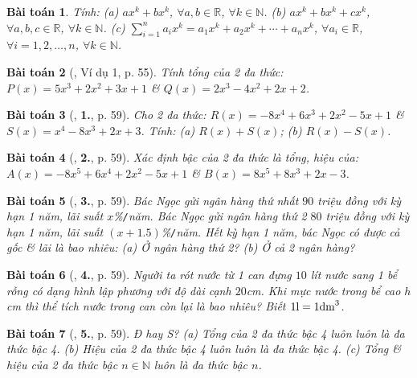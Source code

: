 \documentclass{article}
\numberwithin{equation}{section}
\newtheorem{baitoan}{Bài toán}
\begin{document}
\begin{baitoan}
	Tính: (a) $ax^k + bx^k$, $\forall a,b\in\mathbb{R}$, $\forall k\in\mathbb{N}$. (b) $ax^k + bx^k + cx^k$, $\forall a,b,c\in\mathbb{R}$, $\forall k\in\mathbb{N}$. (c) $\sum_{i=1}^n a_ix^k = a_1x^k + a_2x^k + \cdots + a_nx^k$, $\forall a_i\in\mathbb{R}$, $\forall i = 1,2,\ldots,n$, $\forall k\in\mathbb{N}$.
\end{baitoan}

\begin{baitoan}[\cite{SGK_Toan_7_Canh_Dieu_tap_2}, Ví dụ 1, p. 55]
	Tính tổng của 2 đa thức: $P(x) = 5x^3 + 2x^2 + 3x + 1$ \& $Q(x) = 2x^3 - 4x^2 + 2x + 2$.
\end{baitoan}

\begin{baitoan}[\cite{SGK_Toan_7_Canh_Dieu_tap_2}, \textbf{1.}, p. 59]
	Cho 2 đa thức: $R(x) = -8x^4 + 6x^3 + 2x^2 - 5x + 1$ \& $S(x) = x^4 - 8x^3 + 2x + 3$. Tính: (a) $R(x) + S(x)$; (b) $R(x) - S(x)$.
\end{baitoan}

\begin{baitoan}[\cite{SGK_Toan_7_Canh_Dieu_tap_2}, \textbf{2.}, p. 59]
	Xác định bậc của 2 đa thức là tổng, hiệu của: $A(x) = -8x^5 + 6x^4 + 2x^2 - 5x + 1$ \& $B(x) = 8x^5 + 8x^3 + 2x - 3$.
\end{baitoan}

\begin{baitoan}[\cite{SGK_Toan_7_Canh_Dieu_tap_2}, \textbf{3.}, p. 59]
	Bác Ngọc gửi ngân hàng thứ nhất $90$ triệu đồng với kỳ hạn 1 năm, lãi suất $x$\%\emph{\texttt{/}}năm. Bác Ngọc gửi ngân hàng thứ 2 $80$ triệu đồng với kỳ hạn 1 năm, lãi suất $(x + 1.5)$\%\emph{\texttt{/}}năm. Hết kỳ hạn 1 năm, bác Ngọc có được cả gốc \& lãi là bao nhiêu: (a) Ở ngân hàng thứ 2? (b) Ở cả 2 ngân hàng?
\end{baitoan}

\begin{baitoan}[\cite{SGK_Toan_7_Canh_Dieu_tap_2}, \textbf{4.}, p. 59]
	Người ta rót nước từ 1 can đựng $10$ lít nước sang 1 bể rỗng có dạng hình lập phương với độ dài cạnh $20$\emph{cm}. Khi mực nước trong bể cao $h$ \emph{cm} thì thể tích nước trong can còn lại là bao nhiêu? Biết $1{\rm l} = 1{\rm dm}^3$.
\end{baitoan}

\begin{baitoan}[\cite{SGK_Toan_7_Canh_Dieu_tap_2}, \textbf{5.}, p. 59]
	Đ hay S? (a) Tổng của 2 đa thức bậc 4 luôn luôn là đa thức bậc 4. (b) Hiệu của 2 đa thức bậc 4 luôn luôn là đa thức bậc 4. (c) Tổng \& hiệu của 2 đa thức bậc $n\in\mathbb{N}$ luôn là đa thức bậc $n$.
\end{baitoan}
\end{document}
